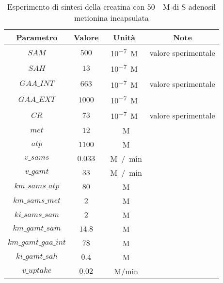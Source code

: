 \begin{table}[H]
	\centering
	\begin{tabular}{| c | c | c | c |}
	\hline
	Parametro & Valore & Unit\`a & Note \\
		\hline
		$SAM$ & $500$ & \si{10^{-7} M} & valore sperimentale \\
		\hline
		$SAH$ & $13$ & \si{10^{-7} M} & \\
		\hline
		$GAA\_INT$ & $663$ & \si{10^{-7} M} & valore sperimentale \\
		\hline
		$GAA\_EXT$ & $1000$ & \si{10^{-7} M} & \\
		\hline
		$CR$ & $73$ & \si{10^{-7} M} & valore sperimentale \\
		\hline
		$met$ & $12$ & \si{\mu M} & \\
		\hline
		$atp$ & $1100$ & \si{\mu M} & \\
		\hline
		$v\_sams$ & $0.033$ & \si{\mu M / min} & \\
		\hline
		$v\_gamt$ & $33$ & \si{\mu M / min} & \\
		\hline
		$km\_sams\_atp$ & $80$ & \si{\mu M} & \\
		\hline
		$km\_sams\_met$ & $2$ & \si{\mu M} & \\
		\hline
		$ki\_sams\_sam$ & $2$ & \si{\mu M} & \\
		\hline
		$km\_gamt\_sam$ & $14.8$ & \si{\mu M} & \\
		\hline
		$km\_gamt\_gaa\_int$ & $78$ & \si{\mu M} & \\
		\hline
		$ki\_gamt\_sah$ & $0.4$ & \si{\mu M} & \\
		\hline
		$v\_uptake$ & $0.02$ & \si{\mu M/min} & \\
		\hline
	\end{tabular}
	\caption{Esperimento di sintesi della creatina con \SI{50}{\mu M} di S-adenosil metionina incapsulata}
	\label{mod:6}
\end{table}

